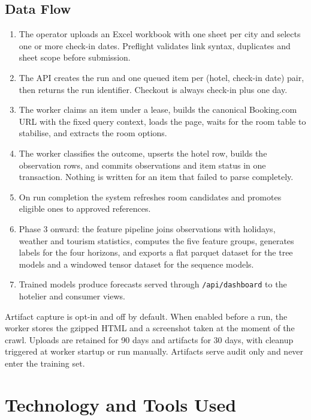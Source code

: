 \subsection{Data Flow}

\begin{enumerate}[leftmargin=*]
    \item The operator uploads an Excel workbook with one sheet per city and selects one or more check-in dates. Preflight validates link syntax, duplicates and sheet scope before submission.
    \item The API creates the run and one queued item per (hotel, check-in date) pair, then returns the run identifier. Checkout is always check-in plus one day.
    \item The worker claims an item under a lease, builds the canonical Booking.com URL with the fixed query context, loads the page, waits for the room table to stabilise, and extracts the room options.
    \item The worker classifies the outcome, upserts the hotel row, builds the observation rows, and commits observations and item status in one transaction. Nothing is written for an item that failed to parse completely.
    \item On run completion the system refreshes room candidates and promotes eligible ones to approved references.
    \item Phase 3 onward: the feature pipeline joins observations with holidays, weather and tourism statistics, computes the five feature groups, generates labels for the four horizons, and exports a flat parquet dataset for the tree models and a windowed tensor dataset for the sequence models.
    \item Trained models produce forecasts served through \texttt{/api/dashboard} to the hotelier and consumer views.
\end{enumerate}

Artifact capture is opt-in and off by default. When enabled before a run, the worker stores the gzipped HTML and a screenshot taken at the moment of the crawl. Uploads are retained for 90 days and artifacts for 30 days, with cleanup triggered at worker startup or run manually. Artifacts serve audit only and never enter the training set.

\section{Technology and Tools Used}

